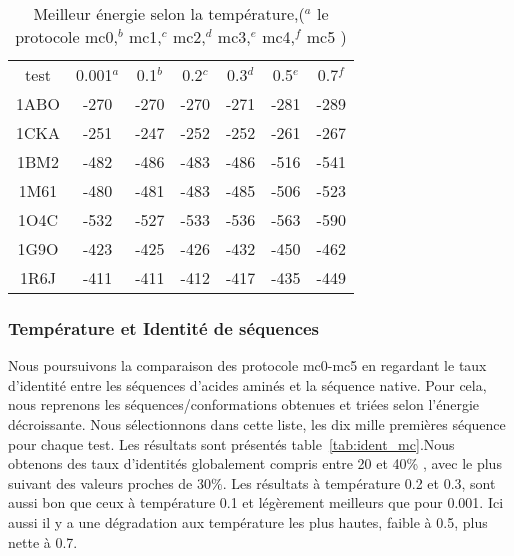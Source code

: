     \begin{table}[!htbp]
      \centering


      \begin{tabular}{ccccccc}

     
        \toprule
         test & 0.001$^a$ & 0.1$^b$ & 0.2$^c$  & 0.3$^d$ & 0.5$^e$ & 0.7$^f$  \\
        \cmidrule{1-7}
        1ABO & -270 & -270 & -270 & -271 & -281  & -289 \\      
        1CKA & -251 & -247 & -252 & -252 & -261  & -267 \\  
        1BM2 & -482 & -486 & -483 & -486 & -516  & -541 \\  
        1M61 & -480 & -481 & -483 & -485 & -506  & -523 \\  
        1O4C & -532 & -527 & -533 & -536 & -563  & -590 \\  
        1G9O & -423 & -425 & -426 & -432 & -450  & -462 \\  
        1R6J & -411 & -411 & -412 & -417 & -435  & -449 \\  

        \bottomrule        
      \end{tabular}
      

      \caption{Meilleur énergie selon la température,($^a$ le protocole mc0,$^b$ mc1,$^c$  mc2,$^d$ mc3,$^e$ mc4,$^f$ mc5 )}    
      \label{tab:ener_mc}
    \end{table}
 
   \subsubsection{Température et Identité de séquences} 
\label{sec:T_et_I}
Nous poursuivons la comparaison des protocole mc0-mc5 en regardant le taux d'identité entre les séquences d'acides aminés et la séquence native. Pour cela, nous reprenons les séquences/conformations obtenues et triées selon l'énergie décroissante. Nous sélectionnons dans cette liste, les dix mille premières séquence pour chaque test. Les résultats sont présentés table~\ref{tab:ident_mc}.Nous obtenons des taux d'identités globalement compris entre 20 et 40\% , avec le plus suivant des valeurs proches de 30\%. Les résultats à température 0.2 et 0.3, sont aussi bon que ceux à température 0.1 et légèrement meilleurs que pour 0.001. Ici aussi il y a une dégradation aux température les plus hautes, faible à 0.5, plus nette à 0.7.

